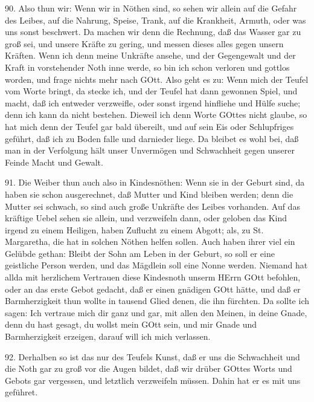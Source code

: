 90. Also thun wir: Wenn wir in Nöthen sind, so sehen wir allein auf die Gefahr des Leibes, auf die Nahrung, Speise, Trank, auf die Krankheit, Armuth, oder was uns sonst beschwert. Da machen wir denn die Rechnung, daß das Wasser gar zu groß sei, und unsere Kräfte zu gering, und messen dieses alles gegen unsern Kräften. Wenn ich denn meine Unkräfte ansehe, und der Gegengewalt und der Kraft in vorstehender Noth inne werde, so bin ich schon verloren und gottlos worden, und frage nichts mehr nach GOtt. Also geht es zu: Wenn mich der Teufel vom Worte bringt, da stecke ich, und der Teufel hat dann gewonnen Spiel, und macht, daß ich entweder verzweifle, oder sonst irgend hinfliehe und Hülfe suche; denn ich kann da nicht bestehen. Dieweil ich denn Worte GOttes nicht glaube, so hat mich denn der Teufel gar bald übereilt, und auf sein Eis oder Schlupfriges geführt, daß ich zu Boden falle und darnieder liege. Da bleibet es wohl bei, daß man in der Verfolgung hält unser Unvermögen und Schwachheit gegen unserer Feinde Macht und Gewalt.

91. Die Weiber thun auch also in Kindesnöthen: Wenn sie in der Geburt sind, da haben sie schon ausgerechnet, daß Mutter und Kind bleiben werden; denn die Mutter sei schwach, so sind auch große Unkräfte des Leibes vorhanden. Auf das kräftige Uebel sehen sie allein, und verzweifeln dann, oder geloben das Kind irgend zu einem Heiligen, haben Zuflucht zu einem Abgott; als, zu St. Margaretha, die hat in solchen Nöthen helfen sollen. Auch haben ihrer viel ein Gelübde gethan: Bleibt der Sohn am Leben in der Geburt, so soll er eine geistliche Person werden, und das Mägdlein soll eine Nonne werden. Niemand hat allda mit herzlichem Vertrauen diese Kindesnoth unserm HErrn GOtt befohlen, oder an das erste Gebot gedacht, daß er einen gnädigen GOtt hätte, und daß er Barmherzigkeit thun wollte in tausend Glied denen, die ihn fürchten. Da sollte ich sagen: Ich vertraue mich dir ganz und gar, mit allen den Meinen, in deine Gnade, denn du hast gesagt, du wollst mein GOtt sein, und mir Gnade und Barmherzigkeit erzeigen, darauf will ich mich verlassen.

92. Derhalben so ist das nur des Teufels Kunst, daß er uns die Schwachheit und die Noth gar zu groß vor die Augen bildet, daß wir drüber GOttes Worts und Gebots gar vergessen, und letztlich verzweifeln müssen. Dahin hat er es mit uns geführet.

